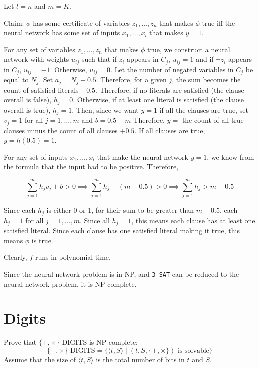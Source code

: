 \documentclass{article}
\begin{document}
        Let $l = n$ and $m = K$. 

        Claim: $\phi$ has some certificate of variables $z_1, \ldots, z_n$ that makes $\phi$ true iff the neural network has some set of inputs $x_1, \ldots, x_l$ that makes $y = 1$.

        For any set of variables $z_1, \ldots, z_n$ that makes $\phi$ true, we construct a neural network with weights $u_{ij}$ such that if $z_i$ appears in $C_j$, $u_{ij} = 1$ and if $\neg z_i$ appears in $C_j$, $u_{ij} = -1$. Otherwise, $u_{ij} = 0$. Let the number of negated variables in $C_j$ be equal to $N_j$. Set $a_j = N_j - 0.5$. Therefore, for a given $j$, the sum becomes the count of satisfied literals $ - 0.5$. Therefore, if no literals are satisfied (the clause overall is false), $h_j = 0$. Otherwise, if at least one literal is satisfied (the clause overall is true), $h_j = 1$. Then, since we want $y = 1$ if all the clauses are true, set $v_j = 1$ for all $j = 1, \ldots, m$ and $b = 0.5 - m$ Therefore, $y = $ the count of all true clauses minus the count of all clauses $+ 0.5$. If all clauses are true, $y = h(0.5) = 1$. 

        For any set of inputs $x_1, \ldots, x_l$ that make the neural network $y = 1$, we know from the formula that the input had to be positive. Therefore, 

        \begin{equation*}
            \sum_{j=1}^{m} h_j v_j + b > 0 \implies \sum_{j=1}^{m} h_j - (m - 0.5) > 0 \implies \sum_{j=1}^{m} h_j > m - 0.5
        \end{equation*}

        Since each $h_j$ is either 0 or 1, for their sum to be greater than $m - 0.5$, each $h_j = 1$ for all $j = 1, \ldots, m$. Since all $h_j = 1$, this means each clause has at least one satisfied literal. Since each clause has one satisfied literal making it true, this means $\phi$ is true.

        Clearly, $f$ runs in polynomial time.

        Since the neural network problem is in NP, and \texttt{3-SAT} can be reduced to the neural network problem, it is NP-complete.

    \section{Digits}
        
        Prove that $\{+, \times\}$-DIGITS is NP-complete:
        \begin{equation*}
            \{+, \times\}\text{-DIGITS} = \{\langle t, S \rangle \mid (t, S, \{+, \times\})\text{ is solvable}\}
        \end{equation*}
        Assume that the size of $\langle t, S \rangle$ is the total number of bits in $t$ and $S$.
\end{document}
